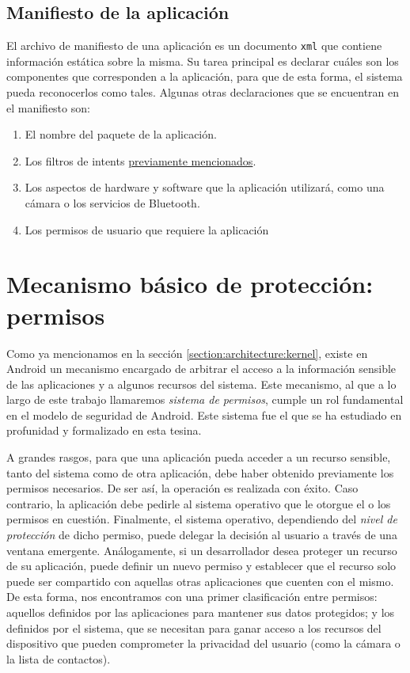 \subsection{Manifiesto de la aplicación}
\label{section:preliminary:manifest}
El archivo de manifiesto de una aplicación es un documento \texttt{xml} que contiene información
estática sobre la misma. Su tarea principal es declarar cuáles son los componentes que corresponden
a la aplicación, para que de esta forma, el sistema pueda reconocerlos como tales. Algunas otras
declaraciones que se encuentran en el manifiesto son:
\begin{enumerate}
    \item El nombre del paquete de la aplicación.
    \item Los filtros de intents \hyperref[section:preliminary:intent-filter]{previamente
              mencionados}.
    \item Los aspectos de hardware y software que la aplicación utilizará, como una cámara o los
          servicios de Bluetooth.
    \item Los permisos de usuario que requiere la aplicación
\end{enumerate}

\section{Mecanismo básico de protección: permisos}
\label{section:android:permissions}
Como ya mencionamos en la sección \ref{section:architecture:kernel}, existe en Android un mecanismo
encargado de arbitrar el acceso a la información sensible de las aplicaciones y a algunos recursos
del sistema. Este mecanismo, al que a lo largo de este trabajo llamaremos \textit{sistema de
    permisos}, cumple un rol fundamental en el modelo de seguridad de Android. Este sistema fue el que
se ha estudiado en profunidad y formalizado en esta tesina.

A grandes rasgos, para que una aplicación pueda acceder a un recurso sensible, tanto del sistema
como de otra aplicación, debe haber obtenido previamente los permisos necesarios. De ser así, la
operación es realizada con éxito. Caso contrario, la aplicación debe pedirle al sistema operativo
que le otorgue el o los permisos en cuestión. Finalmente, el sistema operativo, dependiendo del
\textit{nivel de protección} de dicho permiso, puede delegar la decisión al usuario a través de
una ventana emergente. Análogamente, si un desarrollador desea proteger un recurso de su aplicación,
puede definir un nuevo permiso y establecer que el recurso solo puede ser compartido con aquellas
otras aplicaciones que cuenten con el mismo. De esta forma, nos encontramos con una primer
clasificación entre permisos: aquellos definidos por las aplicaciones para mantener sus datos
protegidos; y los definidos por el sistema, que se necesitan para ganar acceso a los recursos del
dispositivo que pueden comprometer la privacidad del usuario (como la cámara o la lista de
contactos).

